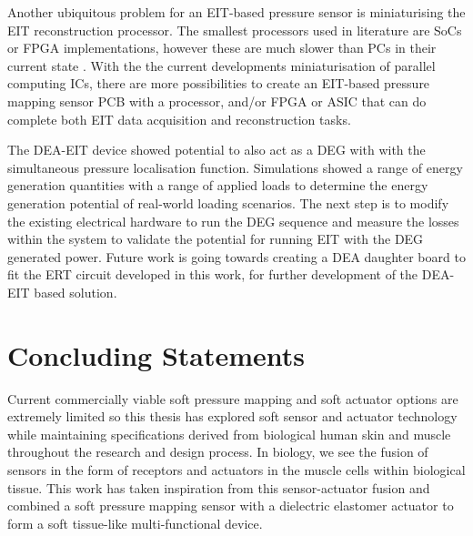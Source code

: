 Another ubiquitous problem for an EIT-based pressure sensor is miniaturising the EIT reconstruction processor. The smallest processors used in literature are SoCs or FPGA implementations, however these are much slower than PCs in their current state \cite{ZamoraArellano2020,Kim2017,Takhti2019,Liu2019}. With the the current developments miniaturisation of parallel computing ICs, there are more possibilities to create an EIT-based pressure mapping sensor PCB with a processor, and/or FPGA or ASIC that can do complete both EIT data acquisition and reconstruction tasks.

The DEA-EIT device showed potential to also act as a DEG with with the simultaneous pressure localisation function. Simulations showed a range of energy generation quantities with a range of applied loads to determine the energy generation potential of real-world loading scenarios. The next step is to modify the existing electrical hardware to run the DEG sequence and measure the losses within the system to validate the potential for running EIT with the DEG generated power. Future work is going towards creating a DEA daughter board to fit the ERT circuit developed in this work, for further development of the DEA-EIT based solution.

\section{Concluding Statements}
Current commercially viable soft pressure mapping and soft actuator options are extremely limited so this thesis has explored soft sensor and actuator technology while maintaining specifications derived from biological human skin and muscle throughout the research and design process. In biology, we see the fusion of sensors in the form of receptors and actuators in the muscle cells within biological tissue. This work has taken inspiration from this sensor-actuator fusion and combined a soft pressure mapping sensor with a dielectric elastomer actuator to form a soft tissue-like multi-functional device.

